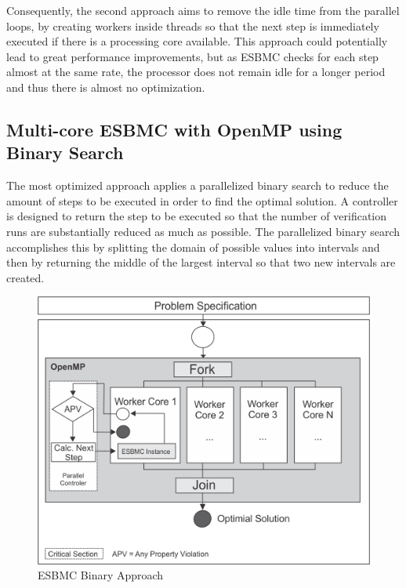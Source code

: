 Consequently, the second approach aims to remove the idle time from the parallel loops, by creating workers inside threads so that the next step is immediately executed if there is a processing core available. This approach could potentially lead to great performance improvements, but as ESBMC checks for each step almost at the same rate, the processor does not remain idle for a longer period and thus there is almost no optimization.

\subsection{Multi-core ESBMC with OpenMP using Binary Search}
\label{Multi-core-ESBMC-with-OpenMP-using-Binary-Search}

The most optimized approach applies a parallelized binary search to reduce the amount of steps to be executed in order to find the optimal solution. A controller is designed to return the step to be executed so that the number of verification runs are substantially reduced as much as possible. The parallelized binary search accomplishes this by splitting the domain of possible values into intervals and then by returning the middle of the largest interval so that two new intervals are created.
%
\begin{figure}[ht]
	\centering
  \includegraphics[scale=0.75]{Image/esbmc-parallel-Controler.png} 
	\caption{ESBMC Binary Approach}
	\label{ESBMC-Binary-Approach}
\end{figure}

